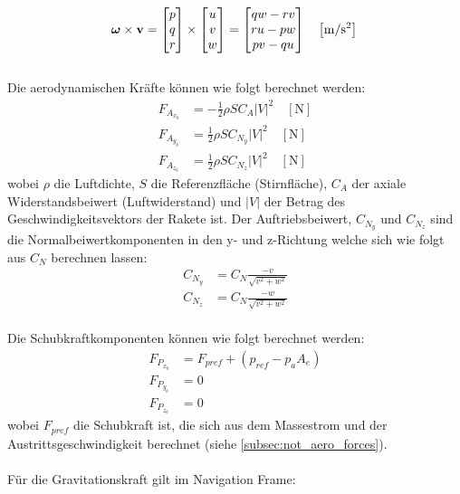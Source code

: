 \begin{equation}
\boldsymbol{\omega} \times \mathbf{v}
=
\begin{bmatrix}
p \\ q \\ r
\end{bmatrix}
\times
\begin{bmatrix}
u \\ v \\ w
\end{bmatrix}
=
\begin{bmatrix}
q w - r v \\
r u - p w \\
p v - q u
\end{bmatrix}
\quad \left[\mathrm{m/s^2}\right] \\
\end{equation}
\\
Die aerodynamischen Kräfte können wie folgt berechnet werden:
\begin{align}
F_{A_{x_b}} &= -\frac{1}{2} \rho S C_{A} |V|^2 \quad \left[\mathrm{N}\right] \\
F_{A_{y_b}} &= \frac{1}{2} \rho S C_{N_{y}} |V|^2 \quad \left[\mathrm{N}\right] \\
F_{A_{z_b}} &= \frac{1}{2} \rho S C_{N_{z}} |V|^2 \quad \left[\mathrm{N}\right]
\end{align}
wobei $\rho$ die Luftdichte, $S$ die Referenzfläche (Stirnfläche), $C_{A}$ der axiale Widerstandsbeiwert (Luftwiderstand) und $|V|$ der Betrag des Geschwindigkeitsvektors  der Rakete ist. Der Auftriebsbeiwert, $C_{N_{y}}$ und $C_{N_{z}}$ sind die Normalbeiwertkomponenten in den y- und z-Richtung welche sich wie folgt aus $C_{N}$ berechnen lassen:
\begin{align}
C_{N_y} &= C_N \frac{-v}{\sqrt{v^2 + w^2}}\\
C_{N_{z}} &= C_N \frac{-w}{\sqrt{v^2 + w^2}}
\end{align}
\\
Die Schubkraftkomponenten können wie folgt berechnet werden:
\begin{align}
F_{P_{x_b}} &= F_{pref} + (p_{ref} - p_{a}A_{e}) \\
F_{P_{y_b}} &= 0 \\
F_{P_{z_b}} &= 0
\end{align}
wobei $F_{pref}$ die Schubkraft ist, die sich aus dem Massestrom und der Austrittsgeschwindigkeit berechnet (siehe \ref{subsec:not_aero_forces}).
\\
\\
Für die Gravitationskraft gilt im Navigation Frame:
